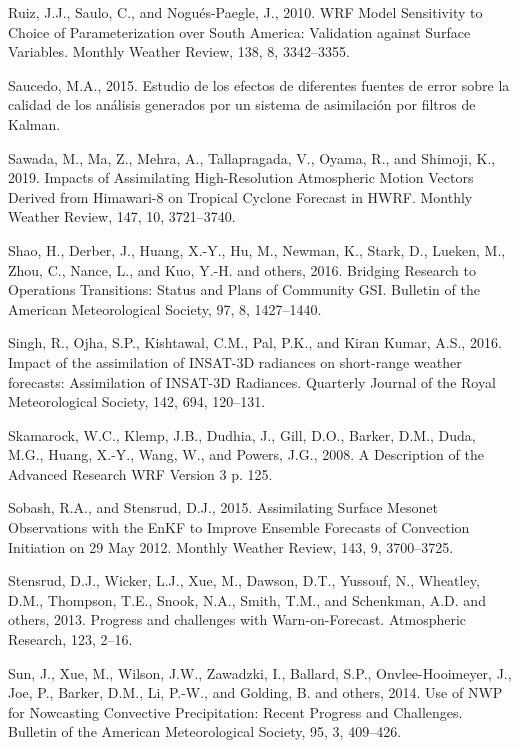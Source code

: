 \documentclass[12pt,oneside]{reedthesis}
\begin{document}
\leavevmode\hypertarget{ref-ruiz2010}{}%
Ruiz, J.J., Saulo, C., and Nogués-Paegle, J., 2010. WRF Model Sensitivity to Choice of Parameterization over South America: Validation against Surface Variables. Monthly Weather Review, 138, 8, 3342--3355.

\leavevmode\hypertarget{ref-saucedo2015}{}%
Saucedo, M.A., 2015. Estudio de los efectos de diferentes fuentes de error sobre la calidad de los análisis generados por un sistema de asimilación por filtros de Kalman.

\leavevmode\hypertarget{ref-sawada2019}{}%
Sawada, M., Ma, Z., Mehra, A., Tallapragada, V., Oyama, R., and Shimoji, K., 2019. Impacts of Assimilating High-Resolution Atmospheric Motion Vectors Derived from Himawari-8 on Tropical Cyclone Forecast in HWRF. Monthly Weather Review, 147, 10, 3721--3740.

\leavevmode\hypertarget{ref-shao2016}{}%
Shao, H., Derber, J., Huang, X.-Y., Hu, M., Newman, K., Stark, D., Lueken, M., Zhou, C., Nance, L., and Kuo, Y.-H. and others, 2016. Bridging Research to Operations Transitions: Status and Plans of Community GSI. Bulletin of the American Meteorological Society, 97, 8, 1427--1440.

\leavevmode\hypertarget{ref-singh2016}{}%
Singh, R., Ojha, S.P., Kishtawal, C.M., Pal, P.K., and Kiran Kumar, A.S., 2016. Impact of the assimilation of INSAT-3D radiances on short-range weather forecasts: Assimilation of INSAT-3D Radiances. Quarterly Journal of the Royal Meteorological Society, 142, 694, 120--131.

\leavevmode\hypertarget{ref-skamarock2008}{}%
Skamarock, W.C., Klemp, J.B., Dudhia, J., Gill, D.O., Barker, D.M., Duda, M.G., Huang, X.-Y., Wang, W., and Powers, J.G., 2008. A Description of the Advanced Research WRF Version 3 p. 125.

\leavevmode\hypertarget{ref-sobash2015}{}%
Sobash, R.A., and Stensrud, D.J., 2015. Assimilating Surface Mesonet Observations with the EnKF to Improve Ensemble Forecasts of Convection Initiation on 29 May 2012. Monthly Weather Review, 143, 9, 3700--3725.

\leavevmode\hypertarget{ref-stensrud2013}{}%
Stensrud, D.J., Wicker, L.J., Xue, M., Dawson, D.T., Yussouf, N., Wheatley, D.M., Thompson, T.E., Snook, N.A., Smith, T.M., and Schenkman, A.D. and others, 2013. Progress and challenges with Warn-on-Forecast. Atmospheric Research, 123, 2--16.

\leavevmode\hypertarget{ref-sun2014}{}%
Sun, J., Xue, M., Wilson, J.W., Zawadzki, I., Ballard, S.P., Onvlee-Hooimeyer, J., Joe, P., Barker, D.M., Li, P.-W., and Golding, B. and others, 2014. Use of NWP for Nowcasting Convective Precipitation: Recent Progress and Challenges. Bulletin of the American Meteorological Society, 95, 3, 409--426.
\end{document}
